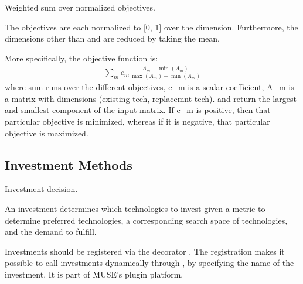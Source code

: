 \documentclass[letterpaper,10pt,english]{sphinxmanual}
\begin{document}
\begin{fulllineitems}
\label{\detokenize{api:muse.decisions.weighted_sum}}
Weighted sum over normalized objectives.

The objectives are each normalized to {[}0, 1{]} over the 
dimension. Furthermore, the dimensions other than  and 
are reduced by taking the mean.

More specifically, the objective function is:
\begin{equation*}
\begin{split}\sum_m c_m \frac{A_m - \min(A_m)}{\max(A_m) - \min(A_m)}\end{split}
\end{equation*}
where sum runs over the different objectives, c\_m is a scalar coefficient,
A\_m is a matrix with dimensions (existing tech, replacemnt tech). 
and  return the largest and smallest component of the input matrix.
If c\_m is positive, then that particular objective is minimized, whereas if
it is negative, that particular objective is maximized.

\end{fulllineitems}



\subsection{Investment Methods}
\label{\detokenize{api:module-muse.investments}}\label{\detokenize{api:investment-methods}}
Investment decision.

An investment determines which technologies to invest given a metric to
determine preferred technologies, a corresponding search space of technologies,
and the demand to fulfill.

Investments should be registered via the decorator . The
registration makes it possible to call investments dynamically through
, by specifying the name of the investment. It is part of
MUSE’s plugin platform.
\end{document}
